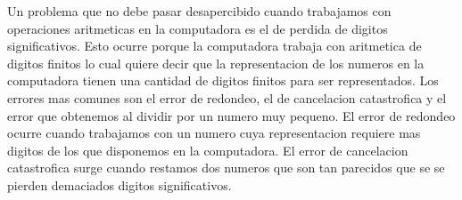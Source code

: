 
\indent Un problema que no debe pasar desapercibido cuando trabajamos con operaciones aritmeticas en la computadora es el de perdida de digitos significativos. 
Esto ocurre porque la computadora trabaja con aritmetica de digitos finitos lo cual quiere decir que la representacion de los numeros en la computadora tienen una cantidad de digitos finitos para ser representados. 
Los errores mas comunes son el error de redondeo, el de cancelacion catastrofica y el error que obtenemos al dividir por un numero muy pequeno. 
El error de redondeo ocurre cuando trabajamos con un numero cuya representacion requiere mas digitos de los que disponemos en la computadora. 
El error de cancelacion catastrofica surge cuando restamos dos numeros que son tan parecidos que se se pierden demaciados digitos significativos.